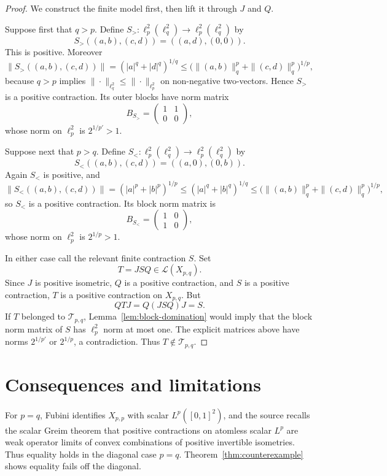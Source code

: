 \documentclass[11pt]{amsart}
\theoremstyle{remark}
\newcommand{\calT}{\mathcal T}
\newcommand{\calL}{\mathcal L}
\begin{document}
\begin{proof}
We construct the finite model first, then lift it through $J$ and $Q$.

Suppose first that $q>p$.  Define $S_>:\ell_p^2(\ell_q^2)\to
\ell_p^2(\ell_q^2)$ by
\[
        S_>((a,b),(c,d))=((a,d),(0,0)).
\]
This is positive.  Moreover
\[
 \|S_>((a,b),(c,d))\|
 = (|a|^q+|d|^q)^{1/q}
 \le \big(\|(a,b)\|_q^p+\|(c,d)\|_q^p\big)^{1/p},
\]
because $q>p$ implies $\|\cdot\|_{\ell_q^2}\le\|\cdot\|_{\ell_p^2}$ on
non-negative two-vectors.  Hence $S_>$ is a positive contraction.  Its outer
blocks have norm matrix
\[
        B_{S_>}=\begin{pmatrix}1&1\\0&0\end{pmatrix},
\]
whose norm on $\ell_p^2$ is $2^{1/p'}>1$.

Suppose next that $p>q$.  Define $S_<:\ell_p^2(\ell_q^2)\to
\ell_p^2(\ell_q^2)$ by
\[
        S_<((a,b),(c,d))=((a,0),(0,b)).
\]
Again $S_<$ is positive, and
\[
 \|S_<((a,b),(c,d))\|
 = (|a|^p+|b|^p)^{1/p}
 \le (|a|^q+|b|^q)^{1/q}
 \le \big(\|(a,b)\|_q^p+\|(c,d)\|_q^p\big)^{1/p},
\]
so $S_<$ is a positive contraction.  Its block norm matrix is
\[
        B_{S_<}=\begin{pmatrix}1&0\\1&0\end{pmatrix},
\]
whose norm on $\ell_p^2$ is $2^{1/p}>1$.

In either case call the relevant finite contraction $S$.  Set
\[
        T=JSQ\in\calL(X_{p,q}).
\]
Since $J$ is positive isometric, $Q$ is a positive contraction, and $S$ is a
positive contraction, $T$ is a positive contraction on $X_{p,q}$.  But
\[
        QTJ=Q(JSQ)J=S.
\]
If $T$ belonged to $\calT_{p,q}$, Lemma~\ref{lem:block-domination} would imply
that the block norm matrix of $S$ has $\ell_p^2$ norm at most one.  The
explicit matrices above have norms $2^{1/p'}$ or $2^{1/p}$, a contradiction.
Thus $T\notin\calT_{p,q}$.
\end{proof}

\section*{Consequences and limitations}

For $p=q$, Fubini identifies $X_{p,p}$ with scalar $L^p([0,1]^2)$, and the
source recalls the scalar Greim theorem that positive contractions on atomless
scalar $L^p$ are weak operator limits of convex combinations of positive
invertible isometries.  Thus equality holds in the diagonal case $p=q$.
Theorem~\ref{thm:counterexample} shows equality fails off the diagonal.
\end{document}
